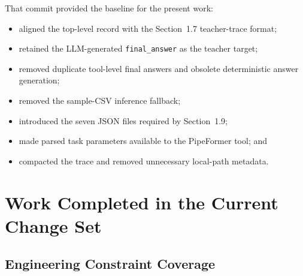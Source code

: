 \documentclass[11pt,a4paper]{article}
\newcommand{\code}[1]{\texttt{#1}}
\begin{document}
That commit provided the baseline for the present work:

\begin{itemize}[leftmargin=*]
  \item aligned the top-level record with the Section~1.7 teacher-trace format;
  \item retained the LLM-generated \code{final\_answer} as the teacher target;
  \item removed duplicate tool-level final answers and obsolete deterministic answer generation;
  \item removed the sample-CSV inference fallback;
  \item introduced the seven JSON files required by Section~1.9;
  \item made parsed task parameters available to the PipeFormer tool; and
  \item compacted the trace and removed unnecessary local-path metadata.
\end{itemize}

\section{Work Completed in the Current Change Set}

\subsection{Engineering Constraint Coverage}
\end{document}
